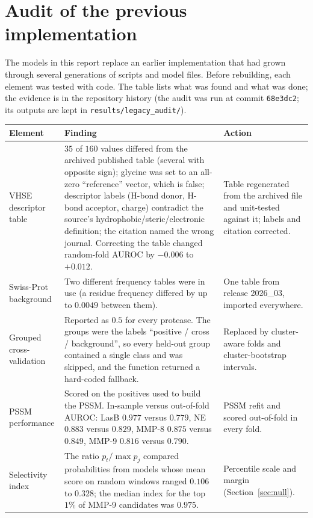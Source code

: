 \section{Audit of the previous implementation}
\label{app:audit}

The models in this report replace an earlier implementation that had grown through several generations of scripts and model files. Before rebuilding, each element was tested with code. The table lists what was found and what was done; the evidence is in the repository history (the audit was run at commit \texttt{68e3dc2}; its outputs are kept in \texttt{results/legacy\_audit/}).

\begin{table}[!htbp]
\centering\footnotesize
\begin{tabular}{@{}p{}p{}p{}@{}}\toprule
Element & Finding & Action \\\midrule
VHSE descriptor table & $35$ of $160$ values differed from the archived published table (several with opposite sign); glycine was set to an all-zero ``reference'' vector, which is false; descriptor labels (H-bond donor, H-bond acceptor, charge) contradict the source's hydrophobic/steric/electronic definition; the citation named the wrong journal. Correcting the table changed random-fold AUROC by $-0.006$ to $+0.012$. & Table regenerated from the archived file and unit-tested against it; labels and citation corrected. \\
Swiss-Prot background & Two different frequency tables were in use (a residue frequency differed by up to $0.0049$ between them). & One table from release 2026\_03, imported everywhere. \\
Grouped cross-validation & Reported as $0.5$ for every protease. The groups were the labels ``positive / cross / background'', so every held-out group contained a single class and was skipped, and the function returned a hard-coded fallback. & Replaced by cluster-aware folds and cluster-bootstrap intervals. \\
PSSM performance & Scored on the positives used to build the PSSM. In-sample versus out-of-fold AUROC: LasB $0.977$ versus $0.779$, NE $0.883$ versus $0.829$, MMP-8 $0.875$ versus $0.849$, MMP-9 $0.816$ versus $0.790$. & PSSM refit and scored out-of-fold in every fold. \\
Selectivity index & The ratio $p_t/\max p_j$ compared probabilities from models whose mean score on random windows ranged $0.106$ to $0.328$; the median index for the top $1\%$ of MMP-9 candidates was $0.975$. & Percentile scale and margin (Section~\ref{sec:null}). \\

\end{tabular}
\end{table}
